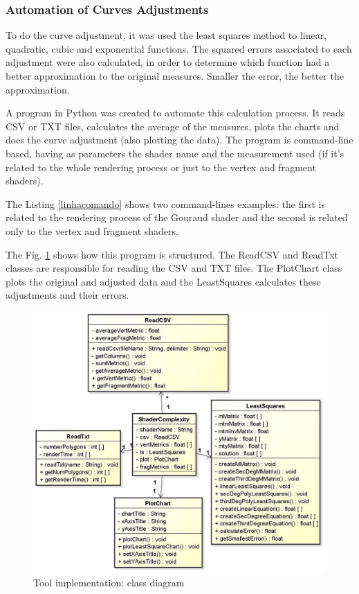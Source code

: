 \documentclass[10pt, conference, compsocconf]{IEEEtran}
\begin{document}
{\subsubsection{Automation of Curves Adjustments}

To do the curve adjustment, it was used the least squares method to linear,
quadratic, cubic and exponential functions. The squared errors associated to each
adjustment were also calculated, in order to determine which function had
a better approximation to the original measures. Smaller the error, the better the approximation.

 A program in Python was created to automate this calculation process. It reads
CSV or TXT files, calculates the average of the measures, plots the charts and
does the curve adjustment (also plotting the data). The program is command-line
based, having as parameters the shader name and the measurement used (if it's
related to the whole rendering process or just to the vertex and fragment shaders).

 The Listing \ref{linhacomando} shows two command-lines examples: the first is related
to the rendering process of the Gouraud shader and the second is related
only to the vertex and fragment shaders.



 The Fig. \ref{python} shows how this program is structured.
The ReadCSV and ReadTxt classes are responsible for reading the CSV and TXT 
files. The PlotChart class plots the original and adjusted data and the 
LeastSquares calculates these adjustments and their errors.

	\begin{figure}[!t]
	\centering
		\includegraphics[keepaspectratio=true,scale=0.28]{figures/minquad_diag.jpg}
	\caption{Tool implementation: class diagram}
	\label{python}
	\end{figure}

}
\end{document}
